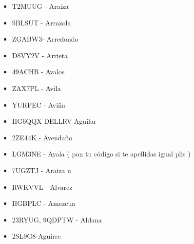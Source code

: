 \begin{itemize}[leftmargin=*,nosep]
\item T2MUUG - Araiza
\item 9BLSUT - Arrazola
\item ZGABW3- Arredondo
\item D8VY2V - Arrieta
\item 49ACHB  -  Avalos
\item ZAX7PL  -  Avila
\item YURFEC - Aviña
\item HG6QQX-DELLRV Aguilar
\item 2ZE44K - Avendaño
\item LGM3NE - Ayala ( pon tu código si te apellidas igual plis )
\item 7UGZTJ - Araiza u
\item RWKVVL - Alvarez
\item HGBPLC - Amezcua
\item 23RYUG, 9QDPTW - Aldana
\item 2SL9G8-Aguirre
\end{itemize}

